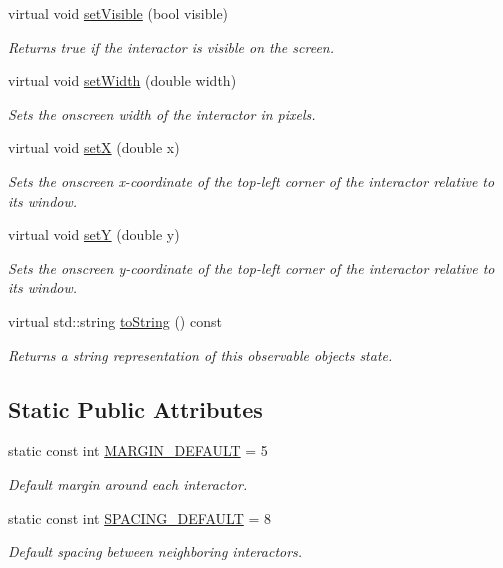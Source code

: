 \begin{DoxyCompactItemize}
virtual void \mbox{\hyperlink{classGInteractor_a18e44e30b31525a243960ca3928125aa}{set\+Visible}} (bool visible)
\begin{DoxyCompactList}\small\item\em Returns true if the interactor is visible on the screen. \end{DoxyCompactList}\item 
virtual void \mbox{\hyperlink{classGInteractor_aa3f3fba4cb131baa8696ba01e3bceca1}{set\+Width}} (double width)
\begin{DoxyCompactList}\small\item\em Sets the onscreen width of the interactor in pixels. \end{DoxyCompactList}\item 
virtual void \mbox{\hyperlink{classGInteractor_a9c18fcc579333bf9653d13ad2b372e39}{setX}} (double x)
\begin{DoxyCompactList}\small\item\em Sets the onscreen x-\/coordinate of the top-\/left corner of the interactor relative to its window. \end{DoxyCompactList}\item 
virtual void \mbox{\hyperlink{classGInteractor_a7d57e2a5c35d27feb58fd498a3cf82b9}{setY}} (double y)
\begin{DoxyCompactList}\small\item\em Sets the onscreen y-\/coordinate of the top-\/left corner of the interactor relative to its window. \end{DoxyCompactList}\item 
virtual std\+::string \mbox{\hyperlink{classGObservable_a1fe5121d6528fdea3f243321b3fa3a49}{to\+String}} () const
\begin{DoxyCompactList}\small\item\em Returns a string representation of this observable object\textquotesingle{}s state. \end{DoxyCompactList}\end{DoxyCompactItemize}
\subsection*{Static Public Attributes}
\begin{DoxyCompactItemize}
\item 
static const int \mbox{\hyperlink{classGContainer_a9fbdb565727493808a950b2bdfa72145}{M\+A\+R\+G\+I\+N\+\_\+\+D\+E\+F\+A\+U\+LT}} = 5
\begin{DoxyCompactList}\small\item\em Default margin around each interactor. \end{DoxyCompactList}\item 
static const int \mbox{\hyperlink{classGContainer_a2f9f03af35bbe9cd402d12efb4caa4a3}{S\+P\+A\+C\+I\+N\+G\+\_\+\+D\+E\+F\+A\+U\+LT}} = 8
\begin{DoxyCompactList}\small\item\em Default spacing between neighboring interactors. \end{DoxyCompactList}\end{DoxyCompactItemize}
